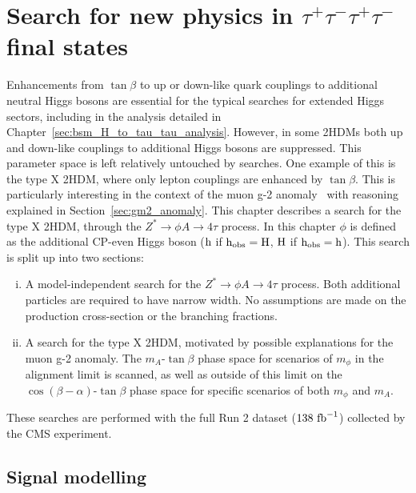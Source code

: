 \chapter{\texorpdfstring{Search for new physics in $\tau^+\tau^-\tau^+\tau^-$ final states}{Search for new physics in tautautautau final states}}
\label{sec:H_A_to_4_tau_analysis}

Enhancements from $\tan\beta$ to up or down-like quark couplings to additional neutral Higgs bosons are essential for the typical searches for extended Higgs sectors, including in the analysis detailed in Chapter~\ref{sec:bsm_H_to_tau_tau_analysis}.
However, in some \ac{2HDM}s both up and down-like couplings to additional Higgs bosons are suppressed.
This parameter space is left relatively untouched by  searches.
One example of this is the type X \ac{2HDM}, where only lepton couplings are enhanced by $\tan\beta$.
This is particularly interesting in the context of the muon g-2 anomaly~\cite{Muong-2:2006rrc,Muong-2:2021ojo} with reasoning explained in Section~\ref{sec:gm2_anomaly}.
This chapter describes a search for the type X \ac{2HDM}, through the $Z^{*}\rightarrow \phi A \rightarrow 4\tau$ process.
In this chapter $\phi$ is defined as the additional \ac{CP}-even Higgs boson (${\text{h}}$ if ${\text{h}}_{\text{obs}}={\text{H}}$, ${\text{H}}$ if ${\text{h}}_{\text{obs}}={\text{h}}$).
This search is split up into two sections:

\begin{enumerate}[i)]
  \item A model-independent search for the $Z^{*}\rightarrow \phi A \rightarrow 4\tau$ process. Both additional particles are required to have narrow width. No assumptions are made on the production cross-section or the branching fractions.
   \item A search for the type X \ac{2HDM}, motivated by possible explanations for the muon g-2 anomaly. The $m_{A}$-$\tan\beta$ phase space for scenarios of $m_\phi$ in the alignment limit is scanned, as well as outside of this limit on the $\cos(\beta-\alpha)$-$\tan\beta$ phase space for specific scenarios of both $m_\phi$ and $m_A$.
\end{enumerate}

These searches are performed with the full Run 2 dataset ($138 \text{ fb}^{-1}$) collected by the \ac{CMS} experiment. 

\section{Signal modelling}
\label{sec:4tau_signal_modelling}

